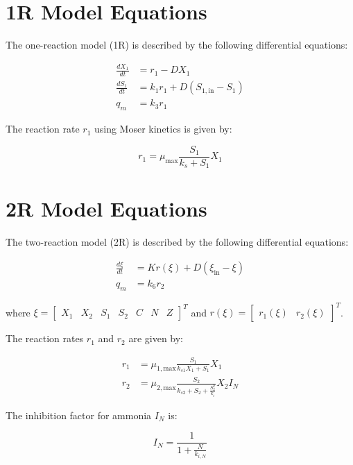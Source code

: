 \documentclass{article}
\begin{document}
\section*{1R Model Equations}

The one-reaction model (1R) is described by the following differential equations:

\begin{align*}
\frac{dX_1}{dt} &= r_1 - D X_1 \\
\frac{dS_1}{dt} &= k_1 r_1 + D(S_{1,\text{in}} - S_1) \\
q_m &= k_3 r_1
\end{align*}

The reaction rate \( r_1 \) using Moser kinetics is given by:

\begin{equation*}
r_1 = \mu_{\text{max}} \frac{S_1}{k_s + S_1} X_1
\end{equation*}

\section*{2R Model Equations}

The two-reaction model (2R) is described by the following differential equations:

\begin{align*}
\frac{d\xi}{dt} &= K r(\xi) + D(\xi_{\text{in}} - \xi) \\
q_m &= k_6 r_2
\end{align*}

where \( \xi = \begin{bmatrix} X_1 & X_2 & S_1 & S_2 & C & N & Z \end{bmatrix}^T \) and \( r(\xi) = \begin{bmatrix} r_1(\xi) & r_2(\xi) \end{bmatrix}^T \).

The reaction rates \( r_1 \) and \( r_2 \) are given by:

\begin{align*}
r_1 &= \mu_{1,\text{max}} \frac{S_1}{k_{s1} X_1 + S_1} X_1 \\
r_2 &= \mu_{2,\text{max}} \frac{S_2}{k_{s2} + S_2 + \frac{S_2^2}{k_i}} X_2 I_N
\end{align*}

The inhibition factor for ammonia \( I_N \) is:

\begin{equation*}
I_N = \frac{1}{1 + \frac{N}{k_{i,N}}}
\end{equation*}
\end{document}
